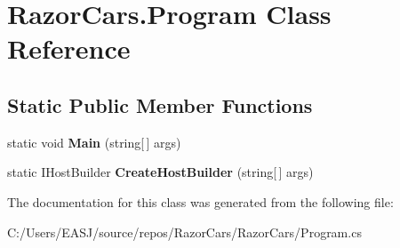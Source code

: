 \hypertarget{class_razor_cars_1_1_program}{}\section{Razor\+Cars.\+Program Class Reference}
\label{class_razor_cars_1_1_program}
\subsection*{Static Public Member Functions}
\begin{DoxyCompactItemize}
\item 
\mbox{\label{class_razor_cars_1_1_program_aef4a2e1b05af5ef8c535891a1e438013}} 
static void {\bfseries Main} (string\mbox{[}$\,$\mbox{]} args)
\item 
\mbox{\label{class_razor_cars_1_1_program_a3e85821cb2d429ac18191e56a36d9701}} 
static I\+Host\+Builder {\bfseries Create\+Host\+Builder} (string\mbox{[}$\,$\mbox{]} args)
\end{DoxyCompactItemize}


The documentation for this class was generated from the following file\+:\begin{DoxyCompactItemize}
\item 
C\+:/\+Users/\+E\+A\+S\+J/source/repos/\+Razor\+Cars/\+Razor\+Cars/Program.\+cs\end{DoxyCompactItemize}
